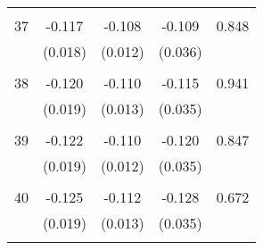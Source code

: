 \begin{tabular}{l*{1}{cccc}}
 & & & &\\
  37       & -0.117 & -0.108 & -0.109 & 0.848 \\
          & (0.018) & (0.012) & (0.036) & \\
 & & & &\\
  38       & -0.120 & -0.110 & -0.115 & 0.941 \\
          & (0.019) & (0.013) & (0.035) & \\
 & & & &\\
  39       & -0.122 & -0.110 & -0.120 & 0.847 \\
          & (0.019) & (0.012) & (0.035) & \\
 & & & &\\
  40       & -0.125 & -0.112 & -0.128 & 0.672 \\
          & (0.019) & (0.013) & (0.035) & \\
 & & & &\\
\hline\hline
\end{tabular}

